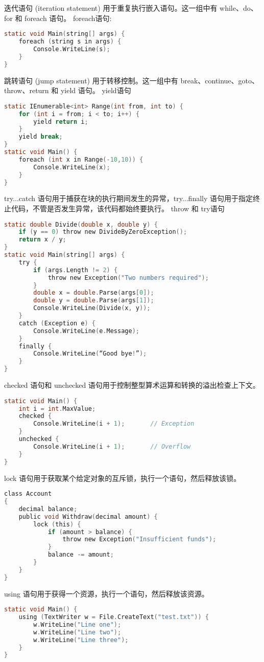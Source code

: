 迭代语句 (iteration statement) 用于重复执行嵌入语句。这一组中有 while、do、for 和 foreach 语句。
foreach语句:
\begin{lstlisting}[language=C]
static void Main(string[] args) {
    foreach (string s in args) {
        Console.WriteLine(s);
    }
}
\end{lstlisting}


跳转语句 (jump statement) 用于转移控制。这一组中有 break、continue、goto、throw、return 和 yield 语句。
yield语句 
\begin{lstlisting}[language=C]
static IEnumerable<int> Range(int from, int to) {
    for (int i = from; i < to; i++) {
        yield return i;
    }
    yield break;
}
static void Main() {
    foreach (int x in Range(-10,10)) {
        Console.WriteLine(x);
    }
}
\end{lstlisting}

try...catch 语句用于捕获在块的执行期间发生的异常，try...finally 语句用于指定终止代码，不管是否发生异常，该代码都始终要执行。
throw 和 try语句
 \begin{lstlisting}[language=C] 
 static double Divide(double x, double y) {
    if (y == 0) throw new DivideByZeroException();
    return x / y;
}
static void Main(string[] args) {
    try {
        if (args.Length != 2) {
            throw new Exception("Two numbers required");
        }
        double x = double.Parse(args[0]);
        double y = double.Parse(args[1]);
        Console.WriteLine(Divide(x, y));
    }
    catch (Exception e) {
        Console.WriteLine(e.Message);
    }
    finally {
        Console.WriteLine(“Good bye!”);
    }
}
\end{lstlisting}

checked 语句和 unchecked 语句用于控制整型算术运算和转换的溢出检查上下文。
 \begin{lstlisting}[language=C] 
static void Main() {
    int i = int.MaxValue;
    checked {
        Console.WriteLine(i + 1);       // Exception
    }
    unchecked {
        Console.WriteLine(i + 1);       // Overflow
    }
}
\end{lstlisting}

lock 语句用于获取某个给定对象的互斥锁，执行一个语句，然后释放该锁。
 \begin{lstlisting}[language=C] 
class Account
{
    decimal balance;
    public void Withdraw(decimal amount) {
        lock (this) {
            if (amount > balance) {
                throw new Exception("Insufficient funds");
            }
            balance -= amount;
        }
    }
}
\end{lstlisting}

using 语句用于获得一个资源，执行一个语句，然后释放该资源。
 \begin{lstlisting}[language=C] 
static void Main() {
    using (TextWriter w = File.CreateText("test.txt")) {
        w.WriteLine("Line one");
        w.WriteLine("Line two");
        w.WriteLine("Line three");
    }
}
\end{lstlisting}


